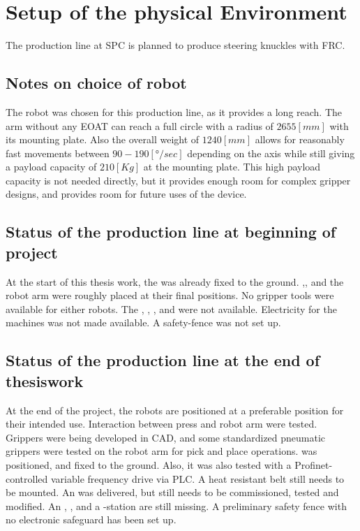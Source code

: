\chapter{Setup of the physical Environment}
The production line at \ac{SPC} is planned to produce steering knuckles with \ac{FRC}.



\section{Notes on choice of robot} %
The robot was chosen for this production line, as it provides a long reach. The arm without any \ac{EOAT} can reach a full circle with a radius of $2655 [\textit{mm}]$ with its mounting plate. Also the overall weight of $1240 [\textit{mm}]$ allows for reasonably fast movements between $90-190 [\textit{°/sec}] $ depending on the axis while still giving a payload capacity of $210 [\textit{Kg}]$ at the mounting plate.\cite{210FDatasheet}
This high payload capacity is not needed directly, but it provides enough room for complex gripper designs, and provides room for future uses of the device.

\section{Status of the production line at beginning of project}
At the start of this thesis work, the  was already fixed to the ground. 
,, and the robot arm were roughly placed at their final positions.
No gripper tools were available for either robots.
The , , ,  and  were not available.
Electricity for the machines was not made available.
A safety-fence was not set up.

\section{Status of the production line at the end of thesiswork}
At the end of the project, the robots are positioned at a preferable position for their intended use. Interaction between press and robot arm were tested. Grippers were being developed in \ac{CAD}, and some standardized pneumatic grippers were tested on the robot arm for pick and place operations.  was positioned, and fixed to the ground. Also, it was also tested with a Profinet-controlled variable frequency drive via \ac{PLC}. A heat resistant belt still needs to be mounted. An  was delivered, but still needs to be commissioned, tested and modified. 
An , ,  and a -station are still missing.
A preliminary safety fence with no electronic safeguard has been set up. 


